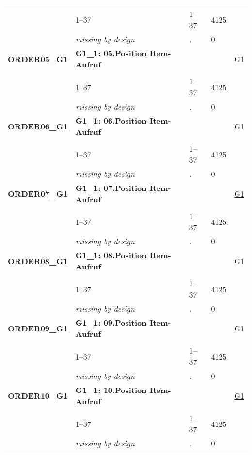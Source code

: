 \begin{longtable}{| L{2.65cm} | L{8cm} | C{1.5cm} | R{1.25cm} | C{2.25cm}  |}
   &  &  &  &  \\ 
   & 1--37 & 1--37 & 4125 &  \\ 
   & \textit{missing by design} & \textit{.} & 0 &  \\ 
   \midrule
\textbf{ORDER05\_G1}\label{var:ORDER05:G1} & \textbf{G1\_1: 05.Position Item-Aufruf} &  &  & \hyperref[G1]{G1} \\ 
   &  &  &  &  \\ 
   & 1--37 & 1--37 & 4125 &  \\ 
   & \textit{missing by design} & \textit{.} & 0 &  \\ 
   \midrule
\textbf{ORDER06\_G1}\label{var:ORDER06:G1} & \textbf{G1\_1: 06.Position Item-Aufruf} &  &  & \hyperref[G1]{G1} \\ 
   &  &  &  &  \\ 
   & 1--37 & 1--37 & 4125 &  \\ 
   & \textit{missing by design} & \textit{.} & 0 &  \\ 
   \midrule
\textbf{ORDER07\_G1}\label{var:ORDER07:G1} & \textbf{G1\_1: 07.Position Item-Aufruf} &  &  & \hyperref[G1]{G1} \\ 
   &  &  &  &  \\ 
   & 1--37 & 1--37 & 4125 &  \\ 
   & \textit{missing by design} & \textit{.} & 0 &  \\ 
   \midrule
\textbf{ORDER08\_G1}\label{var:ORDER08:G1} & \textbf{G1\_1: 08.Position Item-Aufruf} &  &  & \hyperref[G1]{G1} \\ 
   &  &  &  &  \\ 
   & 1--37 & 1--37 & 4125 &  \\ 
   & \textit{missing by design} & \textit{.} & 0 &  \\ 
   \midrule
\textbf{ORDER09\_G1}\label{var:ORDER09:G1} & \textbf{G1\_1: 09.Position Item-Aufruf} &  &  & \hyperref[G1]{G1} \\ 
   &  &  &  &  \\ 
   & 1--37 & 1--37 & 4125 &  \\ 
   & \textit{missing by design} & \textit{.} & 0 &  \\ 
   \midrule
\textbf{ORDER10\_G1}\label{var:ORDER10:G1} & \textbf{G1\_1: 10.Position Item-Aufruf} &  &  & \hyperref[G1]{G1} \\ 
   &  &  &  &  \\ 
   & 1--37 & 1--37 & 4125 &  \\ 
   & \textit{missing by design} & \textit{.} & 0 &  \\ 

\end{longtable}
